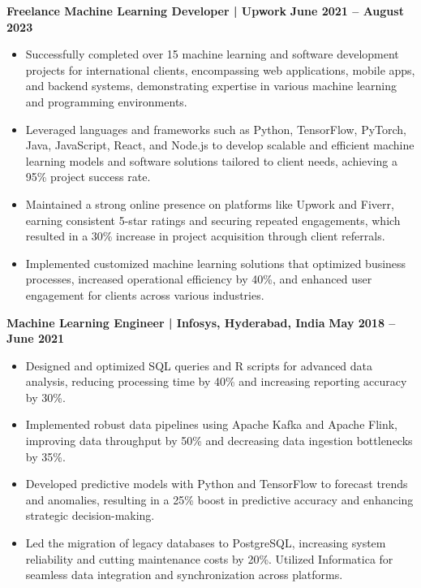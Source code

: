\documentclass{article}
\begin{document}
\vspace{1mm} 


\noindent \textbf{Freelance Machine Learning Developer | Upwork} \hfill \textbf{June 2021 – August 2023}
\begin{itemize}[noitemsep,nolistsep,leftmargin=*]
\item {\small Successfully completed over 15 machine learning and software development projects for international clients, encompassing web applications, mobile apps, and backend systems, demonstrating expertise in various machine learning and programming environments.}
\item {\small Leveraged languages and frameworks such as Python, TensorFlow, PyTorch, Java, JavaScript, React, and Node.js to develop scalable and efficient machine learning models and software solutions tailored to client needs, achieving a 95\% project success rate.}
\item {\small Maintained a strong online presence on platforms like Upwork and Fiverr, earning consistent 5-star ratings and securing repeated engagements, which resulted in a 30\% increase in project acquisition through client referrals.}
\item {\small Implemented customized machine learning solutions that optimized business processes, increased operational efficiency by 40\%, and enhanced user engagement for clients across various industries.}
\end{itemize}

\vspace{1mm} 

\noindent \textbf{Machine Learning Engineer | Infosys, Hyderabad, India} \hfill \textbf{May 2018 – June 2021}
\begin{itemize}[noitemsep,nolistsep,leftmargin=*]
\item {\small Designed and optimized SQL queries and R scripts for advanced data analysis, reducing processing time by 40\% and increasing reporting accuracy by 30\%.}
\item {\small Implemented robust data pipelines using Apache Kafka and Apache Flink, improving data throughput by 50\% and decreasing data ingestion bottlenecks by 35\%.}
\item {\small Developed predictive models with Python and TensorFlow to forecast trends and anomalies, resulting in a 25\% boost in predictive accuracy and enhancing strategic decision-making.}
\item {\small Led the migration of legacy databases to PostgreSQL, increasing system reliability and cutting maintenance costs by 20\%. Utilized Informatica for seamless data integration and synchronization across platforms.}
\end{itemize}
\end{document}
